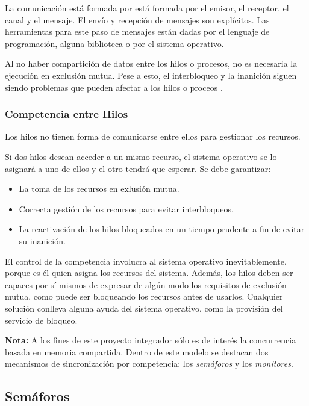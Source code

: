 La comunicación está formada por está formada por el emisor, el receptor, el
canal y el mensaje. El envío y recepción de mensajes son explícitos.
Las herramientas para este paso de mensajes están dadas por el lenguaje de
programación, alguna biblioteca o por el sistema operativo.

Al no haber compartición de datos entre los hilos o procesos, no es necesaria la
ejecución en exclusión mutua. Pese a esto, el interbloqueo y la inanición siguen
siendo problemas que pueden afectar a los hilos o proceos
\cite{SistOpStallings}.

\subsubsection{Competencia entre Hilos}

Los hilos no tienen forma de comunicarse entre ellos para gestionar los
recursos.

Si dos hilos desean acceder a un mismo recurso, el sistema operativo se lo
asignará a uno de ellos y el otro tendrá que esperar. Se debe garantizar:
\begin{itemize}
    \item La toma de los recursos en exlusión mutua.
    \item Correcta gestión de los recursos para evitar interbloqueos.
    \item La reactivación de los hilos bloqueados en un tiempo prudente a fin de
    evitar su inanición.
\end{itemize}
El control de la competencia involucra al sistema operativo
inevitablemente, porque es él quien asigna los recursos del sistema.
Además, los hilos deben ser capaces por sí mismos de expresar de algún
modo los requisitos de exclusión mutua, como puede ser bloqueando los
recursos antes de usarlos. Cualquier solución conlleva alguna ayuda del
sistema operativo, como la provisión del servicio de
bloqueo.\cite{SistOpStallings}

\begin{framed}
\textbf{Nota:} A los fines de este proyecto integrador sólo es de interés la
concurrencia basada en memoria compartida. Dentro de este modelo se destacan dos
mecanismos de sincronización por competencia: los \textit{semáforos} y los
\textit{monitores}.
\end{framed}

\subsection{Semáforos}
\label{semaforos}

